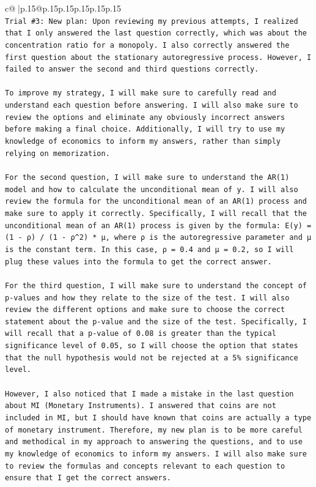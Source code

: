 \documentclass{article}
\begin{document}
{\begin{supertabular}{c@{$\;$}|p{.15\linewidth}@{}p{.15\linewidth}p{.15\linewidth}p{.15\linewidth}p{.15\linewidth}p{.15\linewidth}}
{{{\\ 
\texttt{Trial \#3: New plan: Upon reviewing my previous attempts, I realized that I only answered the last question correctly, which was about the concentration ratio for a monopoly. I also correctly answered the first question about the stationary autoregressive process. However, I failed to answer the second and third questions correctly.} \\
\\ 
\texttt{To improve my strategy, I will make sure to carefully read and understand each question before answering. I will also make sure to review the options and eliminate any obviously incorrect answers before making a final choice. Additionally, I will try to use my knowledge of economics to inform my answers, rather than simply relying on memorization.} \\
\\ 
\texttt{For the second question, I will make sure to understand the AR(1) model and how to calculate the unconditional mean of y. I will also review the formula for the unconditional mean of an AR(1) process and make sure to apply it correctly. Specifically, I will recall that the unconditional mean of an AR(1) process is given by the formula: E(y) = (1 {-} ρ) / (1 {-} ρ\^{}2) * μ, where ρ is the autoregressive parameter and μ is the constant term. In this case, ρ = 0.4 and μ = 0.2, so I will plug these values into the formula to get the correct answer.} \\
\\ 
\texttt{For the third question, I will make sure to understand the concept of p{-}values and how they relate to the size of the test. I will also review the different options and make sure to choose the correct statement about the p{-}value and the size of the test. Specifically, I will recall that a p{-}value of 0.08 is greater than the typical significance level of 0.05, so I will choose the option that states that the null hypothesis would not be rejected at a 5\% significance level.} \\
\\ 
\texttt{However, I also noticed that I made a mistake in the last question about MI (Monetary Instruments). I answered that coins are not included in MI, but I should have known that coins are actually a type of monetary instrument. Therefore, my new plan is to be more careful and methodical in my approach to answering the questions, and to use my knowledge of economics to inform my answers. I will also make sure to review the formulas and concepts relevant to each question to ensure that I get the correct answers.} \\
}}}
\end{supertabular}}
\end{document}
